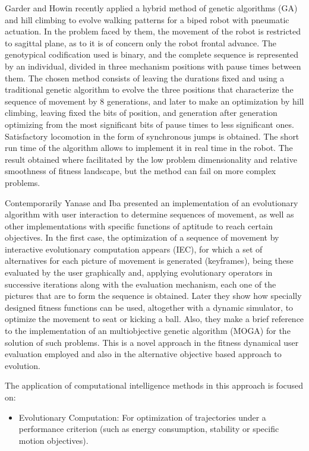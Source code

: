 Garder and Howin \cite{Garder06Robot} recently applied a hybrid method of genetic algorithms (GA) and hill climbing to evolve walking patterns  for a biped robot with pneumatic actuation. In the problem faced by them, the movement of the robot is restricted to sagittal plane, as to it is of concern only the robot frontal advance. The genotypical codification used is binary, and the complete sequence is represented by an individual, divided in three mechanism positions with pause times between them. The chosen method consists of leaving the durations fixed and using a traditional genetic algorithm to evolve the three positions that characterize the sequence of movement by 8 generations, and later to make an optimization by hill climbing, leaving fixed the bits of position, and generation after generation optimizing from the most significant bits of pause times to less significant ones. Satisfactory locomotion in the form of synchronous jumps is obtained. The short run time of the algorithm allows to implement it in real time in the robot. The result obtained where facilitated by the low problem dimensionality and relative smoothness of fitness landscape, but the method can fail on more complex problems.


Contemporarily Yanase and Iba \cite{Yanase06Evolutionary} presented an implementation of an evolutionary algorithm with user interaction to determine sequences of movement, as well as other implementations with specific functions of aptitude to reach certain objectives. In the first case, the optimization of a sequence of movement by interactive evolutionary computation appears (IEC), for which a set of alternatives for each picture of movement is generated (keyframes), being these evaluated by the user graphically and, applying evolutionary operators in successive iterations along with the evaluation mechanism, each one of the pictures that are to form the sequence is obtained. Later they show how specially designed fitness functions can be used, altogether with a dynamic simulator, to optimize the movement to seat or kicking a ball. Also, they make a brief reference to the implementation of an multiobjective genetic algorithm (MOGA) for the solution of such problems. This is a novel approach in the fitness dynamical user evaluation employed and also in the alternative objective based approach to evolution.

The application of computational intelligence methods in this approach is focused on:
\begin{itemize}
\item Evolutionary Computation: For optimization of trajectories under a performance criterion (such as energy consumption, stability or specific motion objectives).
\end{itemize}

